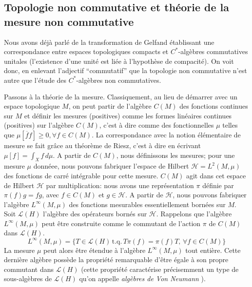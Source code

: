 \subsection{Topologie non commutative et th\'eorie de la mesure non commutative}

Nous avons d\'ej\`a parl\'e de la transformation de Gelfand \'etablissant une 
correspondance entre espaces topologiques compacts et $C^{*}$-alg\`ebres 
commutatives unitales (l'existence d'une unit\'e est li\'ee \`a l'hypoth\`ese de compacit\'e).
 On voit donc, en enlevant l'adjectif ``commutatif''  que la topologie non commutative n'est autre que l'\'etude des 
$C^{*}$-alg\`ebres non commutatives.

Passons \`a la th\'eorie de la mesure. Classiquement, au lieu de d\'emarrer 
avec un espace topologique $M$, on peut partir de l'alg\`ebre $C(M)$ des 
fonctions continues sur $M$ et d\'efinir les mesures  (positives) comme 
les formes lin\'eaires continues (positives) sur l'alg\`ebre $C(M)$, c'est 
\`a dire comme des fonctionnelles $\mu$ telles que $\mu[\overline{f}f] 
\geq 0, \forall f \in C(M)$. La correspondance avec la notion 
\'el\'ementaire de mesure se fait gr\^ace au th\'eor\`eme de Riesz, c'est \`a 
dire en \'ecrivant $\mu[f] = \int_{X} f \, d\mu$. A partir de 
$C(M)$, nous d\'efinissons les mesures; pour une mesure $\mu$ donn\'eee, 
nous pouvons fabriquer l'espace de Hilbert ${\mathcal H} = 
L^{2}(M,\mu)$ des fonctions de carr\'e int\'egrable pour cette mesure.
$C(M)$ agit dans cet espace de Hilbert ${\mathcal H}$ par 
multiplication: nous avons une repr\'esentation $\pi$ d\'efinie par $\pi(f)  
g = fg$, avec $f\in C(M)$ et $g \in {\mathcal H}$.
A partir de ${\mathcal H}$, nous pouvons fabriquer l'alg\`ebre 
$L^\infty(M,\mu)$ des fonctions mesurables essentiellement born\'ees 
sur $M$. Soit ${\mathcal L(H)}$ l'alg\`ebre des op\'erateurs 
born\'es sur $\mathcal H$. Rappelons que l'alg\`ebre $L^\infty(M,\mu)$ peut \^etre construite comme le 
commutant de l'action $\pi$ de $C(M)$ dans ${\mathcal L(H)}.$
$$L^\infty(M,\mu) = \{ T \in {\mathcal L(H)} \,  \mbox{t.q.} \,  T \pi(f) = 
\pi(f) T, \,  \forall f \in C(M) \}$$
La mesure $\mu$ peut alors \^etre \'etendue \`a l'alg\`ebre $L^\infty(M,\mu)$ 
tout enti\`ere.
Cette derni\`ere alg\`ebre  poss\`ede la propri\'et\'e 
remarquable d'\^etre \'egale \`a son propre commutant dans ${\mathcal 
L(H)}$ (cette propri\'et\'e  caract\'erise pr\'ecisemment un type de 
sous-alg\`ebres de ${\mathcal L(H)}$ qu'on appelle {\sl alg\`ebres de Von 
Neumann \/}). 

